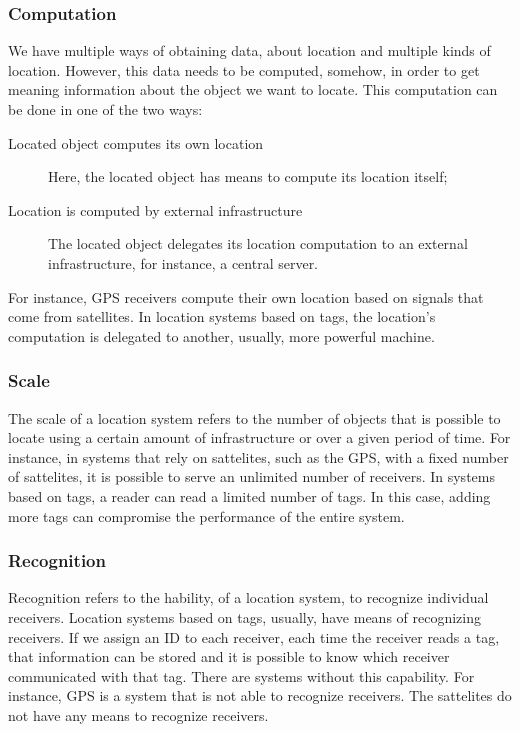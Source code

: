 \subsubsection{Computation}
\label{sub:background_computation}
We have multiple ways of obtaining data, about location and multiple kinds of location.
However, this data needs to be computed, somehow, in order to get meaning information about the object we want to locate.
This computation can be done in one of the two ways:
\begin{description}
  \item[Located object computes its own location] Here, the located object has means to compute its location itself;
  \item[Location is computed by external infrastructure] The located object delegates its location computation to an external infrastructure, for instance, a central server.
\end{description}

For instance, \gls{GPS} receivers compute their own location based on signals that come from satellites.
In location systems based on tags, the location's computation is delegated to another, usually, more powerful machine.

\subsubsection{Scale}
\label{sub:background_scale}
The scale of a location system refers to the number of objects that is possible to locate using a certain amount of infrastructure or over a given period of time.
For instance, in systems that rely on sattelites, such as the \gls{GPS}, with a fixed number of sattelites, it is possible to serve an unlimited number of receivers.
In systems based on tags, a reader can read a limited number of tags.
In this case, adding more tags can compromise the performance of the entire system.

\subsubsection{Recognition}
\label{sub:background_recognition}
Recognition refers to the hability, of a location system, to recognize individual receivers.
Location systems based on tags, usually, have means of recognizing receivers.
If we assign an \gls{ID} to each receiver, each time the receiver reads a tag, that information can be stored and it is possible to know which receiver communicated with that tag.
There are systems without this capability.
For instance, \gls{GPS} is a system that is not able to recognize receivers.
The sattelites do not have any means to recognize receivers.


